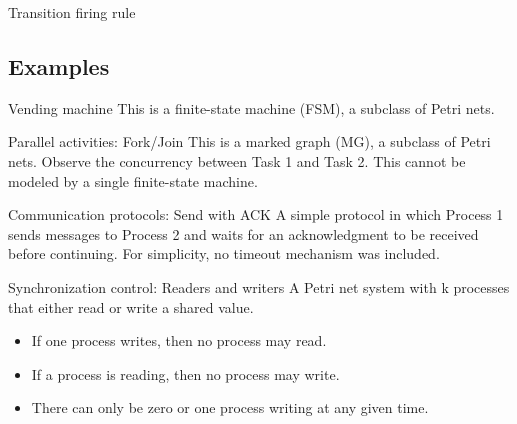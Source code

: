\documentclass{beamer}
\begin{document}
\begin{frame}{Transition firing rule}
  \begin{figure}[!htb]
    \centering
    
  \end{figure}
\end{frame}

\subsection{Examples}

\begin{frame}{Vending machine}
  \scriptsize
  This is a finite-state machine (FSM), a subclass of Petri nets.

  \begin{figure}
    \centering
    
  \end{figure}
\end{frame}

\begin{frame}{Parallel activities: Fork/Join}
  \scriptsize
  This is a marked graph (MG), a subclass of Petri nets.
  Observe the concurrency between Task 1 and Task 2.
  This cannot be modeled by a single finite-state machine. 

  \begin{figure}
    \centering
    
  \end{figure}
\end{frame}

\begin{frame}{Communication protocols: Send with ACK}
  \scriptsize
  A simple protocol in which Process 1 sends messages to Process 2 and
  waits for an acknowledgment to be received before continuing.
  For simplicity, no timeout mechanism was included.

  \begin{figure}
    \centering
    
  \end{figure}
\end{frame}

\begin{frame}{Synchronization control: Readers and writers}
  \scriptsize
  A Petri net system with k processes that either read or write a shared value.

  \begin{itemize}
    \item If one process writes, then no process may read.
    \item If a process is reading, then no process may write.
    \item There can only be zero or one process writing at any given time.
  \end{itemize}

  \begin{figure}
    \centering
    
  \end{figure}
\end{frame}
\end{document}
